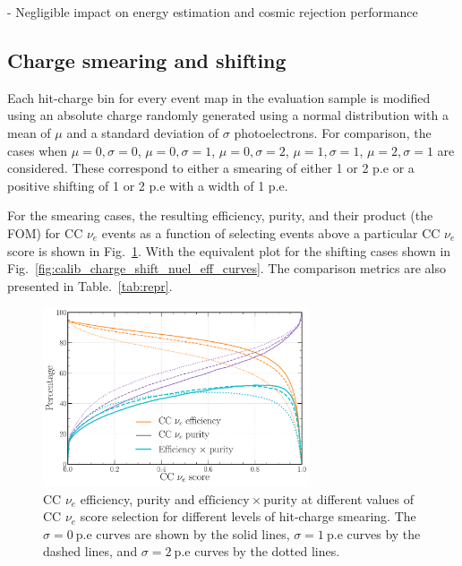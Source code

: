 - Negligible impact on energy estimation and cosmic rejection performance

\subsection*{Charge smearing and shifting} %

Each hit-charge bin for every event map in the evaluation sample is modified using an absolute
charge randomly generated using a normal distribution with a mean of $\mu$ and a standard
deviation of $\sigma$ photoelectrons. For comparison, the cases when $\mu=0,\sigma=0$,
$\mu=0,\sigma=1$, $\mu=0,\sigma=2$, $\mu=1,\sigma=1$, $\mu=2,\sigma=1$ are considered. These
correspond to either a smearing of either 1 or 2 p.e or a positive shifting of 1 or 2 p.e with a
width of 1 p.e.

For the smearing cases, the resulting efficiency, purity, and their product (the FOM) for CC
$\nu_{e}$ events as a function of selecting events above a particular CC $\nu_{e}$ score is shown
in Fig.~\ref{fig:calib_charge_rand_nuel_eff_curves}. With the equivalent plot for the shifting
cases shown in Fig.~\ref{fig:calib_charge_shift_nuel_eff_curves}. The comparison metrics are also
presented in Table.~\ref{tab:repr}.

\begin{figure} %
    \includegraphics[width=0.7\textwidth]{diagrams/7-results/calib_charge_rand_nuel_eff_curves.pdf}
    \caption[CC $\nu_{e}$ efficiency and purity curves for different levels of hit-charge smearing]
    {CC $\nu_{e}$ efficiency, purity and $\mathrm{efficiency}\times\mathrm{purity}$ at different
        values of CC $\nu_{e}$ score selection for different levels of hit-charge smearing. The
        $\sigma=0~\mathrm{p.e}$ curves are shown by the solid lines, $\sigma=1~\mathrm{p.e}$ curves by
        the dashed lines, and $\sigma=2~\mathrm{p.e}$ curves by the dotted lines.}
    \label{fig:calib_charge_rand_nuel_eff_curves}
\end{figure}

